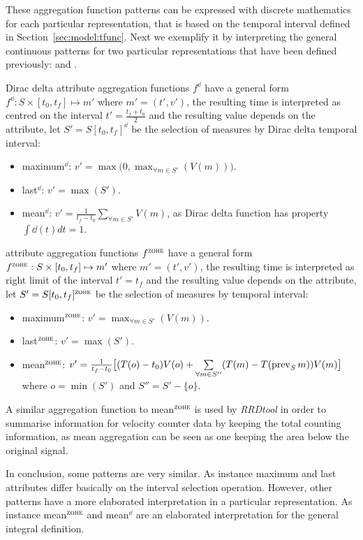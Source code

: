 These aggregation function patterns can be expressed with discrete
mathematics for each particular representation, that is based on the
temporal interval defined in Section~\ref{sec:model:tfunc}. Next we
exemplify it by interpreting the general continuous patterns for two
particular representations that have been defined previously: \dd{}
and \zohe{}.


Dirac delta attribute aggregation functions $f^\dd$ have a general
form $f^\dd : S \times [t_0,t_f]\mapsto m'$ where $m'=(t',v')$, the
resulting time is interpreted as centred on the interval
$t'=\frac{t_f+t_0}{2}$ and the resulting value depends on the
attribute, let $S'=S[t_0,t_f]^\dd$ be the selection of measures by
Dirac delta temporal interval:
\begin{itemize}
\item maximum$^\dd$: $v' = \max\big(0,\max_{\forall m \in S'}(V(m))\big)$. 
\item last$^\dd$: $v' = \max(S')$.
\item mean$^\dd$: $v' = \frac{1}{t_f-t_0} \sum\limits_{\forall m
    \in S'} V(m)$, as Dirac delta function has property $\int\dd(t)dt=1$.
\end{itemize}


\zohe{} attribute aggregation functions $f^\zohe{}$ have a general
form $f^\zohe{} : S \times [t_0,t_f]\mapsto m'$ where $m'=(t',v')$,
the resulting time is interpreted as right limit of the interval
$t'=t_f$ and the resulting value depends on the attribute, let
$S'=S[t_0,t_f]^\zohe{}$ be the selection of measures by \zohe{} temporal
interval:
\begin{itemize}
\item maximum$^\zohe{}$: $v' = \max_{\forall m \in S'}(V(m))$. 
\item last$^\zohe{}$: $v' = \max(S')$.
\item mean$^\zohe{}$: $v' = \frac{1}{t_f-t_0} \big[ (T(o)-t_0)V(o) +
  \sum\limits_{\forall m \in S''}( T(m)- T(\operatorname*{prev}_S
  m) )V(m) \big]$ where $o=\min(S')$ and $S''= S' - \{o\}$.
\end{itemize}

A similar aggregation function to mean$^\zohe{}$ is used by \emph{RRDtool}
\cite{rrdtool} in order to summarise information for velocity coun\-ter
data by keeping the total counting information, as mean aggregation
can be seen as one keeping the area below the original signal.


In conclusion, some patterns are very similar. As instance maximum and
last attributes differ basically on the interval selection
operation. However, other patterns have a more elaborated
interpretation in a particular representation. As instance
mean$^\zohe{}$ and mean$^\dd$ are an elaborated interpretation for
the general integral definition.





